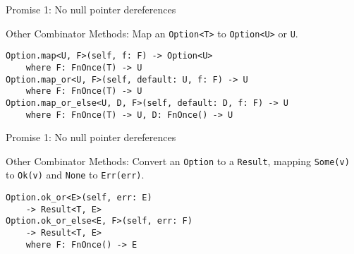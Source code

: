 \documentclass[aspectratio=1610,t]{beamer}
\begin{document}

\begin{frame}[fragile]{Promise 1: No null pointer dereferences}
\begin{block}{Other Combinator Methods:}
\vspace{1em}
Map an \texttt{Option<T>} to \texttt{Option<U>} or \texttt{U}.
\vspace{0.5em}
\begin{verbatim}
Option.map<U, F>(self, f: F) -> Option<U>
    where F: FnOnce(T) -> U
Option.map_or<U, F>(self, default: U, f: F) -> U
    where F: FnOnce(T) -> U
Option.map_or_else<U, D, F>(self, default: D, f: F) -> U
    where F: FnOnce(T) -> U, D: FnOnce() -> U
\end{verbatim}
\end{block}
\end{frame}


\begin{frame}[fragile]{Promise 1: No null pointer dereferences}
\begin{block}{Other Combinator Methods:}
\vspace{1em}
Convert an \texttt{Option} to a \texttt{Result}, mapping \texttt{Some(v)} to
\texttt{Ok(v)} and \texttt{None} to \texttt{Err(err)}.
\vspace{0.5em}
\begin{verbatim}
Option.ok_or<E>(self, err: E)
    -> Result<T, E>
Option.ok_or_else<E, F>(self, err: F)
    -> Result<T, E>
    where F: FnOnce() -> E
\end{verbatim}
\end{block}
\end{frame}
\end{document}
